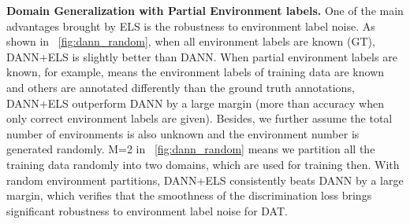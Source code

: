 \documentclass{article} \usepackage{iclr2023_conference,times}
\newcommand{\abbr}[0]{DANN+ELS\xspace}
\newcommand{\ls}[0]{ELS\xspace}
\begin{document}
\textbf{Domain Generalization with Partial Environment labels.} One of the main advantages brought by \ls is the robustness to environment label noise. As shown in \figurename~\ref{fig:dann_random}, when all environment labels are known (GT), \abbr is slightly better than DANN. When partial environment labels are known, for example,  means the environment labels of  training data are known and others are annotated differently than the ground truth annotations, \abbr outperform DANN by a large margin (more than  accuracy when only  correct environment labels are given). Besides, we further assume the total number of environments is also unknown and the environment number is generated randomly. M=2 in \figurename~\ref{fig:dann_random} means we partition all the training data randomly into two domains, which are used for training then. With random environment partitions, \abbr consistently beats DANN by a large margin, which verifies that the smoothness of the discrimination loss brings significant robustness to environment label noise for DAT. 
\end{document}

